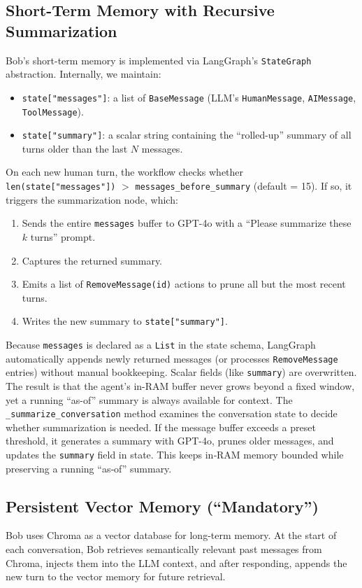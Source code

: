 \documentclass[conference]{IEEEtran}
\begin{document}
\subsection{Short-Term Memory with Recursive Summarization}
Bob’s short-term memory is implemented via LangGraph’s \texttt{StateGraph} abstraction. Internally, we maintain:
\begin{itemize}[leftmargin=*]
  \item \texttt{state["messages"]}: a list of \texttt{BaseMessage} (LLM’s \texttt{HumanMessage}, \texttt{AIMessage}, \texttt{ToolMessage}).
  \item \texttt{state["summary"]}: a scalar string containing the “rolled-up” summary of all turns older than the last $N$ messages.
\end{itemize}

On each new human turn, the workflow checks whether \\
 \texttt{len(state["messages"])} $>$ \texttt{messages\_before\_summary} (default = 15). 
If so, it triggers the summarization node, which:
\begin{enumerate}[leftmargin=*]
  \item Sends the entire \texttt{messages} buffer to GPT-4o with a “Please summarize these $k$ turns” prompt.
  \item Captures the returned summary.
  \item Emits a list of \texttt{RemoveMessage(id)} actions to prune all but the most recent turns.
  \item Writes the new summary to \texttt{state["summary"]}.
\end{enumerate}

Because \texttt{messages} is declared as a \texttt{List} in the state schema, 
LangGraph automatically appends newly returned messages 
(or processes \texttt{RemoveMessage} entries) without manual bookkeeping. 
Scalar fields (like \texttt{summary}) are overwritten. 
The result is that the agent’s in-RAM buffer never grows beyond a 
fixed window, yet a running “as-of” summary is always available for context.
The \texttt{\_summarize\_conversation} method examines the 
conversation state to decide whether summarization is needed. 
If the message buffer exceeds a preset threshold, it generates 
a summary with GPT-4o, prunes older messages, and updates the 
\texttt{summary} field in state. This keeps in‐RAM memory 
bounded while preserving a running “as‐of” summary.

\subsection{Persistent Vector Memory (``Mandatory'')}
Bob uses Chroma as a vector database for long-term memory. 
At the start of each conversation, Bob retrieves semantically 
relevant past messages from Chroma, injects them into the LLM 
context, and after responding, appends the new turn to the 
vector memory for future retrieval.
\end{document}
